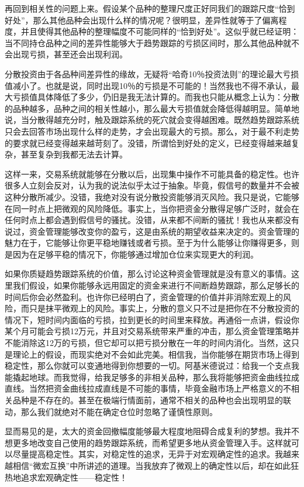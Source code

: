 再回到相关性的问题上来。假设某个品种的整理尺度正好同我们的跟踪尺度“恰到好处”，那么其他品种会出现什么样的情况呢？很明显，差异性就等于了偏离程度，并且使得其他品种的整理幅度不可能同样的“恰到好处”。这似乎就已经证明：当不同持仓品种之间的差异性能够大于趋势跟踪的亏损区间时，那么其他品种就不会出现亏损，甚至还会出现利润。

分散投资由于各品种间差异性的缘故，无疑将“哈奇10％投资法则”的理论最大亏损值减小了。也就是说，同时出现10％的亏损是不可能的！当然我也不得不承认，最大亏损值具体降低了多少，仍旧是我无法计算的。而我也只能从概念上认为：分散的品种越多，品种之间的相关性越小，那么最大亏损值就会降低得越明显。简单地说，当分散得越充分时，触及跟踪系统的死穴就会变得越困难。既然趋势跟踪系统只会去回答市场出现什么样的走势，才会出现最大的亏损。那么，对于最不利走势的要求就已经变得越来越苛刻了。没错，所谓恰到好处的定义，已经变得越来越复杂，甚至复杂到我都无法去计算。

这样一来，交易系统就能够在分散以后，出现集中操作不可能具备的稳定性。也许很多人立刻会反对，认为我的说法似乎太过于抽象。毕竟，假信号的数量并不会被这种分散所减少。没错，我绝对没有说分散投资能够消灭风险。我只是说，它能够在同一时点上把微观的风险降低。事实上，当你把资金分散得足够广泛时，就会在任何时点上都会遇到假信号的骚扰。没错，从来都不间断的骚扰！我也从来都没有说过，资金管理能够改变你的盈亏，这是由系统的期望收益来决定的。资金管理的魅力在于，它能够让你更平稳地赚钱或者亏损。至于为什么能够让你赚得更多，则是因为在足够平稳的情况下，你能够通过增加仓位来实现更大的利润。

如果你质疑趋势跟踪系统的价值，那么讨论这种资金管理就是没有意义的事情。这里我们假设，如果你能够永远用固定的资金来进行不间断趋势跟踪，那么足够长的时间后你会必然盈利。也许你已经明白了，资金管理的价值并非消除宏观上的风险，而只是抹平微观上的风险。事实上，分散的意义只不过是把你在不分散投资的情况下，短时间内面临的亏损，拉到更长的时间里来释放。再通俗一点讲，假设你某个月可能会亏损12万元，并且对交易系统带来严重的冲击，那么资金管理策略并不能消除这12万的亏损，但它却可以把亏损分散在一年的时间内消化。当然，这只是理论上的假设，而现实绝对不会如此完美。相信我，当你能够在期货市场上得到稳定性，那么你就可以变通地得到你想要的一切。阿基米德说过：给我一个支点我能撬起地球。而我觉得，给我足够多的非相关品种，那么我将能够把资金曲线拉成直线。当然把资金曲线拉成直线是不可能的事情，毕竟金融市场上严格意义的不相关品种是不存在的。甚至在极端行情面前，通常不相关的品种也会出现明显的联动，那么我们就绝对不能在确定仓位时忽略了谨慎性原则。

显而易见的是，太大的资金回撤幅度能够最大程度地阻碍合成复利的梦想。我并不想更多地改变自己使用的趋势跟踪系统，而希望更多地从资金管理入手。这样就可以尽量提高稳定性。其实，对稳定性的追求，无异于对宏观确定性的追求。我越来越相信“微宏互换”中所讲述的道理。当我放弃了微观上的确定性以后，却在如此狂热地追求宏观确定性——稳定性！

